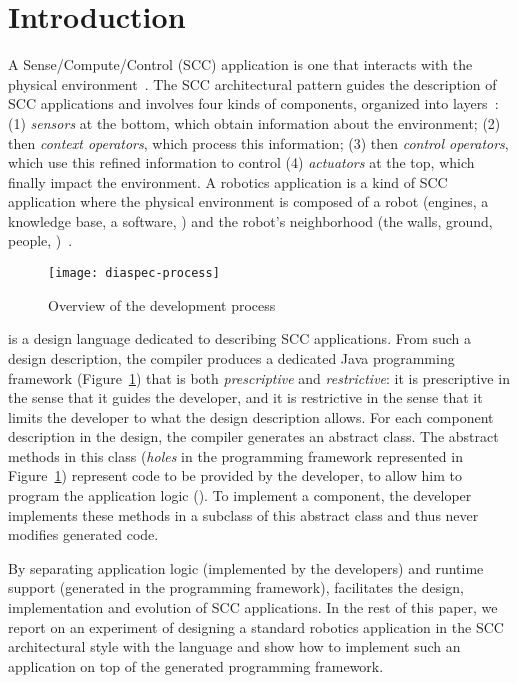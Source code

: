 \section{Introduction}

A Sense/Compute/Control (SCC) application is one that interacts with
the physical environment~\cite{Tayl09a}. The SCC architectural pattern
guides the description of SCC applications and involves four kinds of
components, organized into layers~\cite{Cass11a,Edwar09a}: (1)
\emph{sensors} at the bottom, which obtain information about the
environment; (2) then \emph{context operators}, which process this
information; (3) then \emph{control operators}, which use this refined
information to control (4) \emph{actuators} at the top, which finally
impact the environment. A robotics application is a kind of SCC
application where the physical environment is composed of a robot
(engines, a knowledge base, a software, \etc{}) and the robot's
neighborhood (the walls, ground, people, \etc{})~\cite{Sicil08a}.

\begin{figure}
  \centering
  \texttt{[image: diaspec-process]}
  \caption{Overview of the \diaspec{} development process}
  \label{fig:diaspec-process}
\end{figure}

\diaspec{} is a design language dedicated to describing SCC
applications. From such a design description, the \diaspec{} compiler
produces a dedicated Java programming framework
(Figure~\ref{fig:diaspec-process}) that is both \emph{prescriptive}
and \emph{restrictive}: it is prescriptive in the sense that it guides
the developer, and it is restrictive in the sense that it limits the
developer to what the design description allows. For each component
description in the design, the compiler generates an abstract class.
The abstract methods in this class (\emph{holes} in the programming
framework represented in Figure~\ref{fig:diaspec-process}) represent
code to be provided by the developer, to allow him to program the
application logic (\textit{}). To implement a component, the developer
implements these methods in a subclass of this abstract class and thus
never modifies generated code.

By separating application logic (implemented by the developers) and
runtime support (generated in the programming framework), \diaspec{}
facilitates the design, implementation and evolution of SCC
applications. In the rest of this paper, we report on an experiment of
designing a standard robotics application in the SCC architectural
style with the \diaspec{} language and show how to implement such an
application on top of the generated programming framework.

